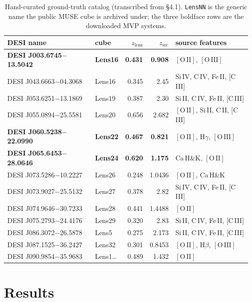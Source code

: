 \documentclass[11pt,letterpaper]{article}
\newcommand{\zlens}{\ensuremath{z_{\mathrm{lens}}}}
\newcommand{\zsrc}{\ensuremath{z_{\mathrm{src}}}}
\newcommand{\muse}{\textsc{MUSE}}
\newcommand{\OII}{\ensuremath{[\mathrm{O\,II}]}}
\newcommand{\OIII}{\ensuremath{[\mathrm{O\,III}]}}
\begin{document}
\begin{table}[ht]
\centering
\caption{Hand-curated ground-truth catalog (transcribed from
\citet{lin2025foundry4} \S4.1). \texttt{LensNN} is the generic name the public
\muse{} cube is archived under; the three boldface rows are the downloaded MVP
systems.}
\label{tab:catalog}
\small
\begin{tabular}{llrrl}
\toprule
DESI name & cube & $\zlens$ & $\zsrc$ & source features \\
\midrule
\textbf{DESI J003.6745$-$13.5042} & \textbf{Lens16} & \textbf{0.431} & \textbf{0.908} & \OII, \OIII \\
DESI J043.6663$-$04.3068 & Lens16 & 0.345 & 2.45  & Si\,IV, C\,IV, Fe\,II, [C\,III] \\
DESI J053.6251$-$13.1869 & Lens19 & 0.387 & 2.30  & Si\,II, C\,IV, Fe\,II, [C\,III] \\
DESI J055.0894$-$25.5581 & Lens20 & 0.656 & 2.682 & \OII, Si\,II, C\,II, [C\,III] \\
\textbf{DESI J060.5238$-$22.0990} & \textbf{Lens22} & \textbf{0.467} & \textbf{0.821} & \OII, H$\gamma$, \OIII \\
\textbf{DESI J065.6453$-$28.0646} & \textbf{Lens24} & \textbf{0.620} & \textbf{1.175} & Ca\,H\&K, \OII \\
DESI J073.5286$-$10.2227 & Lens26 & 0.248 & 1.0436 & \OII, Ca\,H\&K \\
DESI J073.9027$-$25.5132 & Lens27 & 0.378 & 2.82  & Si\,IV, C\,IV, Fe\,II, [C\,III] \\
DESI J074.9646$-$30.7233 & Lens28 & 0.441 & 1.4488 & \OII \\
DESI J075.2793$-$24.4176 & Lens29 & 0.320 & 2.83  & Si\,II, C\,IV, Fe\,II, [C\,III] \\
DESI J086.3072$-$26.5878 & Lens5  & 0.275 & 2.173 & Si\,II, C\,IV, Fe\,II, [C\,III] \\
DESI J087.1525$-$36.2427 & Lens32 & 0.301 & 0.8453 & \OII, H$\beta$, \OIII \\
DESI J090.9854$-$35.9683 & Lens1\ldots & 0.489 & 1.432 & \OII \\
\bottomrule
\end{tabular}
\end{table}

\section{Results}
\end{document}
